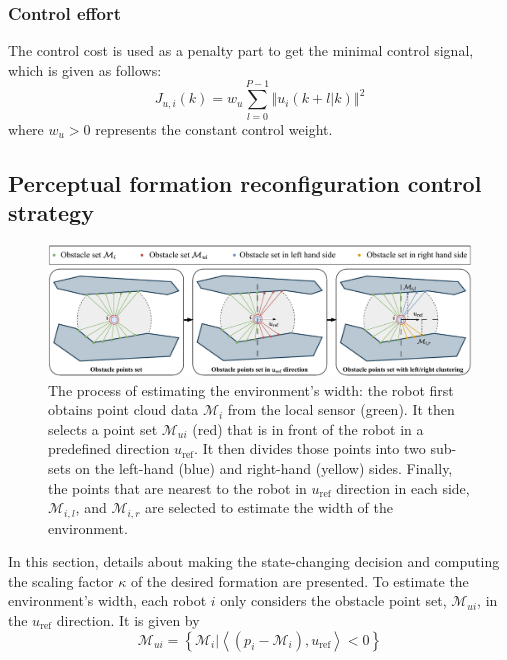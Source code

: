 \subsubsection{Control effort}
The control cost is used as a penalty part to get the minimal control signal, which is given as follows:
\begin{equation}
    J_{u,i}(k)=w_u\sum_{l=0}^{P-1}\left\Vert u_i(k+l|k)\right\Vert^2
\end{equation}
where $w_u>0$ represents the constant control weight.

\subsection{Perceptual formation reconfiguration control strategy}\label{sec:obs_aware}
\begin{figure}
    \centering
    \includegraphics[width=\textwidth]{paper3/images/perception.pdf}
    \caption{The process of estimating the environment's width: the robot first obtains point cloud data $\mathcal{M}_i$ from the local sensor (green). It then selects a point set $\mathcal{M}_{ui}$ (red) that is in front of the robot in a predefined direction $u_\text{ref}$. It then divides those points into two sub-sets on the left-hand (blue) and right-hand (yellow) sides. Finally, the points that are nearest to the robot in $u_\text{ref}$ direction in each side, $\mathcal{M}_{i,l}$, and $\mathcal{M}_{i,r}$ are selected to estimate the width of the environment.}
    \label{fig:perception}
\end{figure}

In this section, details about making the state-changing decision and computing the scaling factor $\kappa$ of the desired formation are presented. To estimate the environment's width, each robot $i$ only considers the obstacle point set, $\mathcal{M}_{ui}$, in the $u_\text{ref}$ direction. It is given by
\begin{equation}
    \mathcal{M}_{ui} = \left\{\mathcal{M}_{i}\vert\left\langle\left(p_i-\mathcal{M}_{i}\right),u_\text{ref}\right\rangle<0\right\}
    \label{eqn:mui}
\end{equation}

